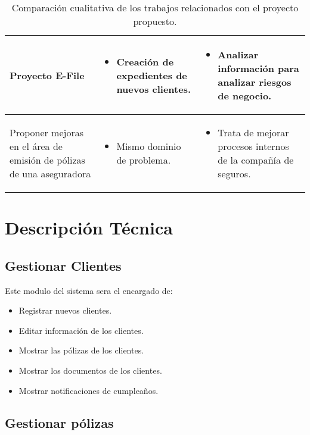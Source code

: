 \begin{table}[h!]
\begin{tabular}{p{} p{} p{}}
\midrule
Proyecto E-File &
\begin{itemize}[leftmargin=*]
	\item Creación de expedientes de nuevos clientes.
\end{itemize} &
\begin{itemize}[leftmargin=*]
	\item Analizar información para analizar riesgos de negocio.
\end{itemize} \\


\midrule
Proponer mejoras en el área de emisión de pólizas de una aseguradora &
\begin{itemize}[leftmargin=*]
	\item Mismo dominio de problema.  
\end{itemize} &
\begin{itemize}[leftmargin=*]
	\item Trata de mejorar procesos internos de la compañía de seguros.
\end{itemize} \\
    \bottomrule
  \end{tabular}
  \caption{Comparación cualitativa de los trabajos relacionados con el proyecto propuesto.}
  \label{table:related}
\end{table}

\section{Descripción Técnica}

\subsection*{Gestionar Clientes}

Este modulo del sistema sera el encargado de:
\begin{itemize}
	\item Registrar nuevos clientes.
	\item Editar información de los clientes.
	\item Mostrar las pólizas de los clientes.
	\item Mostrar los documentos de los clientes.
	\item Mostrar notificaciones de cumpleaños.
\end{itemize}

\subsection*{Gestionar pólizas}

